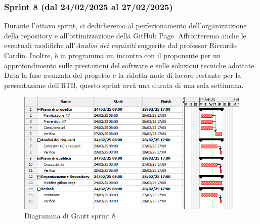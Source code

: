 \subsubsection{Sprint 8 (dal 24/02/2025 al 27/02/2025)}
Durante l'ottavo sprint, ci dedicheremo al perfezionamento dell'organizzazione della repository e all'ottimizzazione della GitHub Page.
Affronteremo anche le eventuali modifiche all'\textit{Analisi dei requisiti} suggerite dal professor Riccardo Cardin.
Inoltre, è in programma un incontro con il proponente per un approfondimento sulle prestazioni del software e sulle soluzioni tecniche adottate.
Data la fase avanzata del progetto e la ridotta mole di lavoro restante per la presentazione dell'RTB, questo sprint avrà una durata di una sola settimana.

\begin{figure}[h!]
    \centering
    \includegraphics[scale = 0.7]{template/images/gantt8.png}
    \caption{Diagramma di Gantt sprint 8}
    \label{fig:3.8} %
\end{figure}

